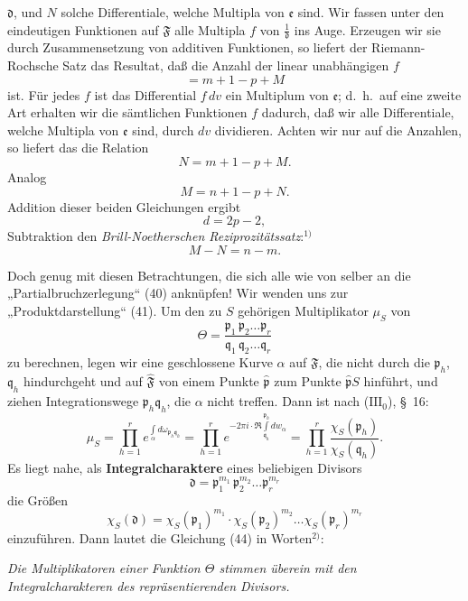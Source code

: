 \documentclass{article}
\begin{document}
$\mathfrak{d}$, und $N$ solche Differentiale, welche Multipla von $\mathfrak{e}$ sind. Wir fassen unter den eindeutigen Funktionen auf $\mathfrak{F}$ alle Multipla $f$ von $\frac{1}{\mathfrak{d}}$ ins Auge. Erzeugen wir sie durch Zusammensetzung von additiven Funktionen, so liefert der Riemann-Rochsche Satz das Resultat, daß die Anzahl der linear unabhängigen $f$
\[ = m + 1 - p + M \]
ist. Für jedes $f$ ist das Differential $f\,dv$ ein Multiplum von $\mathfrak{e}$; d.~h.\ auf eine zweite Art erhalten wir die sämtlichen Funktionen $f$ dadurch, daß wir alle Differentiale, welche Multipla von $\mathfrak{e}$ sind, durch $dv$ dividieren. Achten wir nur auf die Anzahlen, so liefert das die Relation
\[ N = m + 1 - p + M. \]
Analog
\[ M = n + 1 - p + N. \]
Addition dieser beiden Gleichungen ergibt
\[ d = 2p - 2, \]
Subtraktion den \emph{Brill-Noetherschen Reziprozitätssatz}:${}^{1)}$
\[ M - N = n - m. \]

Doch genug mit diesen Betrachtungen, die sich alle wie von selber an die „Partialbruchzerlegung“ (40) anknüpfen! Wir wenden uns zur „Produktdarstellung“ (41). Um den zu $S$ gehörigen Multiplikator $\mu_S$ von
\[ \Theta = \frac{\mathfrak{p}_1 \, \mathfrak{p}_2 \dots \mathfrak{p}_r}{\mathfrak{q}_1 \, \mathfrak{q}_2 \dots \mathfrak{q}_r} \]
zu berechnen, legen wir eine geschlossene Kurve $\alpha$ auf $\mathfrak{F}$, die nicht durch die $\mathfrak{p}_h$, $\mathfrak{q}_h$ hindurchgeht und auf $\hat{\mathfrak{F}}$ von einem Punkte $\hat{\mathfrak{p}}$ zum Punkte $\hat{\mathfrak{p}}S$ hinführt, und ziehen Integrationswege $\mathfrak{p}_h\mathfrak{q}_h$, die $\alpha$ nicht treffen. Dann ist nach ($\mathrm{III}_0$), §~16:
\[ \mu_S = \prod_{h=1}^r e^{\int\limits_\alpha d\omega_{\mathfrak{p}_h \mathfrak{q}_h}} = \prod_{h=1}^r e^{-2\pi i \cdot \Re \int\limits_{\mathfrak{q}_h}^{\mathfrak{p}_h} dw_\alpha} = \prod_{h=1}^r \frac{\chi_S(\mathfrak{p}_h)}{\chi_S(\mathfrak{q}_h)}. \tag{44} \]
Es liegt nahe, als \textbf{Integralcharaktere} eines beliebigen Divisors
\[ \mathfrak{d} = \mathfrak{p}_1^{m_1} \, \mathfrak{p}_2^{m_2} \dots \mathfrak{p}_r^{m_r} \]
die Größen
\[ \chi_S(\mathfrak{d}) = \chi_S(\mathfrak{p}_1)^{m_1} \cdot \chi_S(\mathfrak{p}_2)^{m_2} \dots \chi_S(\mathfrak{p}_r)^{m_r} \]
einzuführen. Dann lautet die Gleichung (44) in Worten${}^{2)}$:

\emph{Die Multiplikatoren einer Funktion $\Theta$ stimmen überein mit den Integralcharakteren des repräsentierenden Divisors.}
\end{document}
